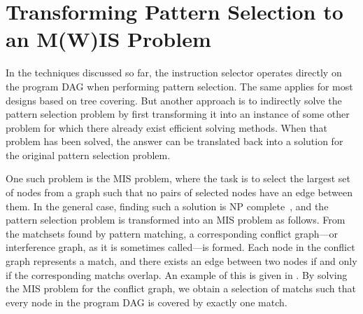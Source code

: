 \section{Transforming Pattern Selection to an M(W)IS Problem}

In the techniques discussed so far, the \gls{instruction selector} operates
directly on the \gls{program DAG} when performing \gls{pattern selection}.
%
The
same applies for most designs based on \gls{tree covering}.
%
But another approach
is to indirectly solve the \gls{pattern selection} problem by first transforming
it into an instance of some other problem for which there already exist
efficient solving methods.
%
When that problem has been solved, the answer can be
translated back into a solution for the original \gls{pattern selection}
problem.

%

One such problem is the \gls{MIS problem}, where the task is to select the
largest set of \glspl{node} from a \gls{graph} such that no pairs of selected
\glspl{node} have an \gls{edge} between them.
%
In the general case, finding such
a solution is \gls{NP complete}~\cite{Garey1979}, and the \gls{pattern
  selection} problem is transformed into an \gls{MIS problem} as follows.
%
From
the \glspl{matchset} found by \gls{pattern matching}, a corresponding
\gls{conflict graph}---or \gls{interference graph}, as it is sometimes
called---is formed.
%
Each \gls{node} in the \gls{conflict graph} represents a
\gls{match}, and there exists an \gls{edge} between two \glspl{node} if and only
if the corresponding \glspl{match} overlap.
%
An example of this is given in
.
%
By solving the \gls{MIS problem} for the \gls{conflict
  graph}, we obtain a selection of \glspl{match} such that every \gls{node} in
the \gls{program DAG} is covered by exactly one \gls{match}.

